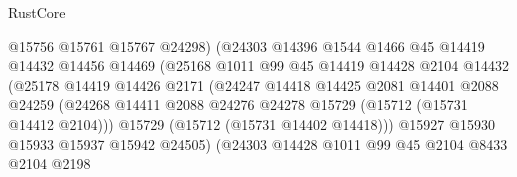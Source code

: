 \begin{lexlean}{RustCore}
\begin{coremodule}
                                    @15756
                                    @15761
                                    @15767
                                    @24298)
                                  (@24303
                                    @14396
                                    @1544
                                    @1466
                                    @45
                                    @14419
                                    @14432
                                    @14456
                                    @14469
                                    (@25168
                                      @1011
                                      @99
                                      @45
                                      @14419
                                      @14428
                                      @2104
                                      @14432
                                      (@25178
                                        @14419
                                        @14426
                                        @2171
                                        (@24247
                                          @14418
                                          @14425
                                          @2081
                                          @14401
                                          @2088
                                          @24259
                                          (@24268
                                            @14411
                                            @2088
                                            @24276
                                            @24278
                                            @15729
                                            (@15712 (@15731 @14412 @2104)))
                                          @15729
                                          (@15712 (@15731 @14402 @14418)))
                                        @15927
                                        @15930
                                        @15933
                                        @15937
                                        @15942
                                        @24505)
                                      (@24303
                                        @14428
                                        @1011
                                        @99
                                        @45
                                        @2104
                                        @8433
                                        @2104
                                        @2198

\end{coremodule}
\end{lexlean}
